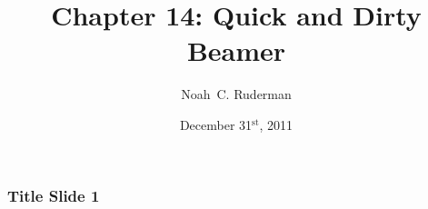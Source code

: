 \documentclass{beamer}
\begin{document}
	\title{Chapter 14: Quick and Dirty Beamer}
	\author{Noah~C. Ruderman}
	\date{December 31$^{\text{st}}$, 2011}

	\maketitle

	\begin{frame}
		\frametitle{Title Slide 1}
	\end{frame}
\end{document}
